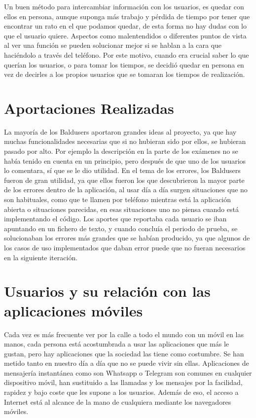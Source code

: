 Un buen método para intercambiar información con los usuarios,  es quedar con ellos en persona, aunque suponga más trabajo y pérdida de tiempo por tener que encontrar un rato en el que podamos quedar, de esta forma no hay dudas con lo que el usuario quiere.
Aspectos como malentendidos o diferentes puntos de vista al ver una función se pueden solucionar mejor si se hablan a la cara que haciéndolo a través del teléfono.
Por este motivo, cuando era crucial saber lo que querían los usuarios, o para tomar los tiempos, se decidió quedar en persona en vez de decirles a los propios usuarios que se tomaran los tiempos de realización.



\section{Aportaciones Realizadas}
\label{secc:aportaciones Realizadas}

La mayoría de los Baldusers aportaron grandes ideas al proyecto, ya que hay muchas funcionalidades necesarias que si no hubieran sido por ellos, se hubieran pasado por alto. Por ejemplo la descripción en la parte de los exámenes no se había tenido en cuenta en un principio, pero después de que uno de los usuarios lo comentara, sí que se le dio utilidad.
En el tema de los errores, los Baldusers fueron de gran utilidad, ya que ellos fueron los que descubrieron la mayor parte de los errores dentro de la aplicación, al usar día a día surgen situaciones que no son habituales, como que te llamen por teléfono mientras está la aplicación abierta o situaciones parecidas, en esas situaciones uno no piensa cuando está implementando el código.
Los aportes que reportaba cada usuario se iban apuntando en un fichero de texto, y cuando concluía el periodo de prueba, se solucionaban los errores más grandes que se habían producido, ya que algunos de los casos de uso implementados que daban error puede que no fueran necesarios en la siguiente iteración.


\section{Usuarios y su relación con las aplicaciones móviles}
\label{secc:usuarios y su relación con las aplicaciones móviles}

Cada vez es más frecuente ver por la calle a todo el mundo con un móvil en las manos, cada persona está acostumbrada a usar las aplicaciones que más le gustan, pero hay aplicaciones que la sociedad las tiene como costumbre. Se han metido tanto en nuestro día a día que no se puede vivir sin ellas. Aplicaciones de mensajería instantánea como son Whatsapp o Telegram son comunes en cualquier dispositivo móvil, han sustituido a las llamadas y los mensajes por la facilidad, rapidez y bajo coste que les supone a los usuarios.
Además de eso, el acceso a Internet está al alcance de la mano de cualquiera mediante los navegadores móviles.

